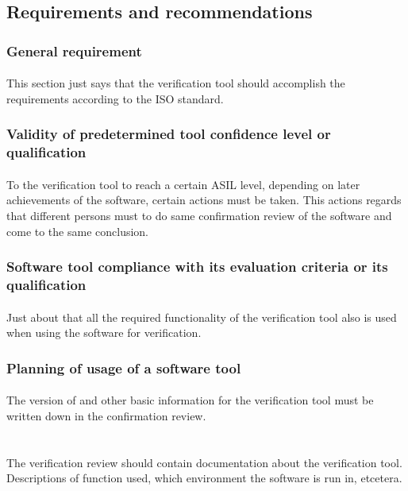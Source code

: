 \documentclass{article}
\begin{document}
\subsection{Requirements and recommendations}
\subsubsection{General requirement}
\paragraph{}
This section just says that the verification tool should accomplish the
requirements according to the ISO standard.
\subsubsection{Validity of predetermined tool confidence level or qualification}
\paragraph{}
To the verification tool to reach a certain ASIL level, depending on later
achievements of the software, certain actions must be taken. This actions
regards that different persons must to do same confirmation review of the
software and come to the same conclusion.
\subsubsection{Software tool compliance with its evaluation criteria or its
qualification}
\paragraph{}
Just about that all the required functionality of the verification tool also is
used when using the software for verification.
\subsubsection{Planning of usage of a software tool}
\paragraph{}
The version of and other basic information for the verification tool must be
written down in the confirmation review. \\\\
\paragraph{}
The verification review should contain documentation about the verification
tool. Descriptions of function used, which environment the software is run in,
etcetera.
\end{document}
